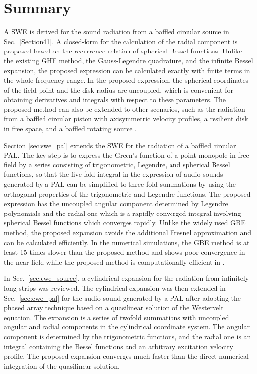 \section{Summary}
A SWE is derived for the sound radiation from a baffled circular source in Sec.~\ref{Section41}.
A closed-form for the calculation of the radial component is proposed based on the recurrence relation of spherical Bessel functions. 
Unlike the existing GHF method, the Gauss-Legendre quadrature, and the infinite Bessel expansion, the proposed expression can be calculated exactly with finite terms in the whole frequency range. 
In the proposed expression, the spherical coordinates of the field point and the disk radius are uncoupled, which is convenient for obtaining derivatives and integrals with respect to these parameters. 
The proposed method can also be extended to other scenarios, such as the radiation from a baffled circular piston with axisymmetric velocity profiles, a resilient disk in free space, and a baffled rotating source \cite{Zhong2020SphericalExpansionCalculating}. 

Section \ref{sec:swe_pal} extends the SWE for the radiation of a baffled circular PAL.
The key step is to express the Green's function of a point monopole in free field by a series consisting of trigonometric, Legendre, and spherical Bessel functions, so that the five-fold integral in the expression of audio sounds generated by a PAL can be simplified to three-fold summations by using the orthogonal properties of the trigonometric and Legendre functions. 
The proposed expression has the uncoupled angular component determined by Legendre polynomials and the radial one which is a rapidly converged integral involving spherical Bessel functions which converges rapidly. 
Unlike the widely used GBE method, the proposed expansion avoids the additional Fresnel approximation and can be calculated efficiently. In the numerical simulations, the GBE method is at least 15 times slower than the proposed method and shows poor convergence in the near field while the proposed method is computationally efficient in . 

In Sec.~\ref{sec:cwe_source}, a cylindrical expansion for the radiation from infinitely long strips was reviewed. 
The cylindrical expansion was then extended in Sec.~\ref{sec:cwe_pal} for the audio sound generated by a PAL after adopting the phased array technique based on a quasilinear solution of the Westervelt equation. 
The expansion is a series of twofold summations with uncoupled angular and radial components in the cylindrical coordinate system. The angular component is determined by the trigonometric functions, and the radial one is an integral containing the Bessel functions and an arbitrary excitation velocity profile. The proposed expansion converges much faster than the direct numerical integration of the quasilinear solution.

